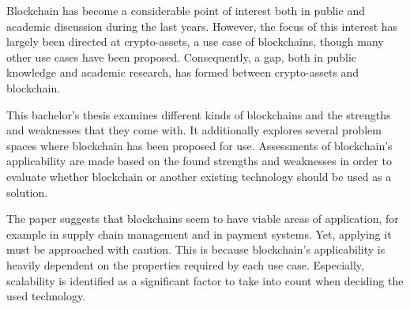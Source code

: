 \begin{enabstract}
Blockchain has become a considerable point of interest both in public
and academic discussion during the last years. However, the focus of
this interest has largely been directed at crypto-assets, a use case
of blockchains, though many other use cases have been proposed.
Consequently, a gap, both in public knowledge and academic research,
has formed between crypto-assets and blockchain. 

This bachelor's thesis examines different kinds of blockchains and the
strengths and weaknesses that they come with. It additionally explores
several problem spaces where blockchain has been proposed for use.
Assessments of blockchain's applicability are made based on the found
strengths and weaknesses in order to evaluate whether blockchain or
another existing technology should be used as a solution.

The paper suggests that blockchains seem to have viable areas of
application, for example in supply chain management and in payment
systems. Yet, applying it must be approached with caution. This is
because blockchain's applicability is heavily dependent on the
properties required by each use case. Especially, scalability is
identified as a significant factor to take into count when deciding
the used technology.

\end{enabstract}
